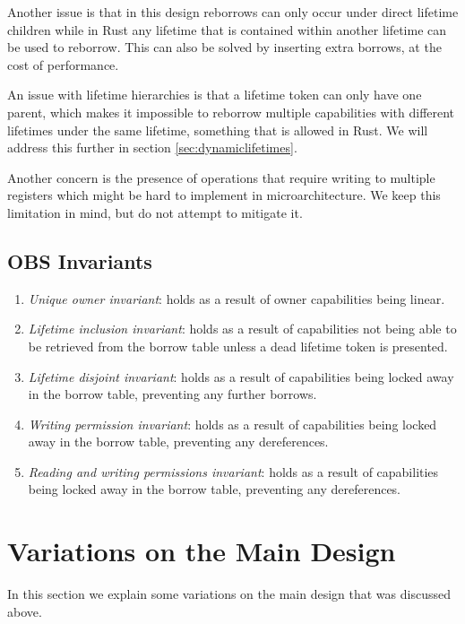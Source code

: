 Another issue is that in this design reborrows can only occur under direct lifetime children while in Rust any lifetime that is contained within another lifetime can be used to reborrow. This can also be solved by inserting extra borrows, at the cost of performance.

An issue with lifetime hierarchies is that a lifetime token can only have one parent, which makes it impossible to reborrow multiple capabilities with different lifetimes under the same lifetime, something that is allowed in Rust.
We will address this further in section \ref{sec:dynamiclifetimes}.

Another concern is the presence of operations that require writing to multiple registers which might be hard to implement in microarchitecture. We keep this limitation in mind, but do not attempt to mitigate it.

\subsection{OBS Invariants}
\begin{enumerate}
    \item \textit{Unique owner invariant}: holds as a result of owner capabilities being linear.
    \item \textit{Lifetime inclusion invariant}: holds as a result of capabilities not being able to be retrieved from the borrow table unless a dead lifetime token is presented.
    \item \textit{Lifetime disjoint invariant}: holds as a result of capabilities being locked away in the borrow table, preventing any further borrows.
    \item \textit{Writing permission invariant}: holds as a result of capabilities being locked away in the borrow table, preventing any dereferences.
    \item \textit{Reading and writing permissions invariant}: holds as a result of capabilities being locked away in the borrow table, preventing any dereferences.
\end{enumerate}

\section{Variations on the Main Design}
In this section we explain some variations on the main design that was discussed above.

